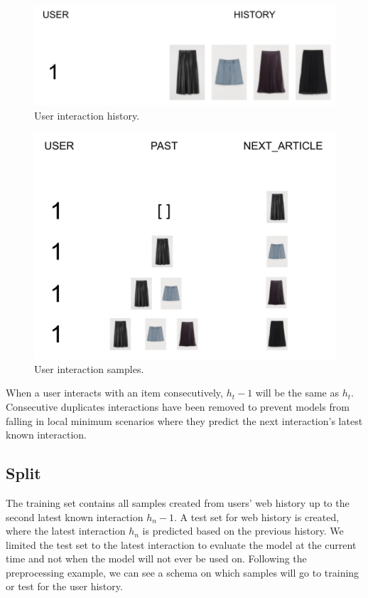 \documentclass{kththesis}
\begin{document}
\begin{figure}[H]
    \centering
    \includegraphics[scale=0.3]{images/dataset/dataset.png}
    \caption{User interaction history.}
\end{figure}

\begin{figure}[H]
    \centering
    \includegraphics[scale=0.45]{images/dataset/predictionsdataset.png}
    \caption{User interaction samples.}
\end{figure}

When a user interacts with an item consecutively, $h_t-1$ will be the same as $h_t$. Consecutive duplicates interactions have been removed to prevent models from falling in local minimum scenarios where they predict the next interaction's latest known interaction.

\subsection{Split}
The training set contains all samples created from users' web history up to the second latest known interaction $h_n-1$. A test set for web history is created, where the latest interaction $h_n$ is predicted based on the previous history. We limited the test set to the latest interaction to evaluate the model at the current time and not when the model will not ever be used on. Following the preprocessing example, we can see a schema on which samples will go to training or test for the user history.
\end{document}
